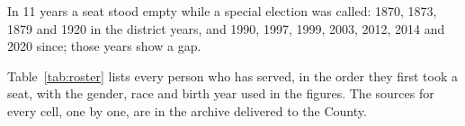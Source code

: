 In 11 years a seat stood empty while a special election was called: 1870, 1873,
1879 and 1920 in the district years, and 1990, 1997, 1999, 2003, 2012, 2014 and
2020 since; those years show a gap.

Table~\ref{tab:roster} lists every person who has served, in the order they
first took a seat, with the gender, race and birth year used in the figures. The
sources for every cell, one by one, are in the archive delivered to the
County.



